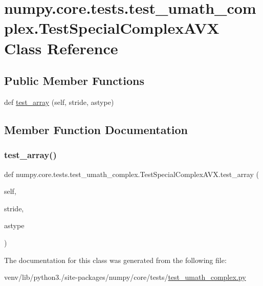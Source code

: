 \hypertarget{classnumpy_1_1core_1_1tests_1_1test__umath__complex_1_1TestSpecialComplexAVX}{}\section{numpy.\+core.\+tests.\+test\+\_\+umath\+\_\+complex.\+Test\+Special\+Complex\+A\+VX Class Reference}
\label{classnumpy_1_1core_1_1tests_1_1test__umath__complex_1_1TestSpecialComplexAVX}
\subsection*{Public Member Functions}
\begin{DoxyCompactItemize}
\item 
def \hyperlink{classnumpy_1_1core_1_1tests_1_1test__umath__complex_1_1TestSpecialComplexAVX_a6d97853c4dc4a00a96a230223026dcdf}{test\+\_\+array} (self, stride, astype)
\end{DoxyCompactItemize}


\subsection{Member Function Documentation}
\mbox{\label{classnumpy_1_1core_1_1tests_1_1test__umath__complex_1_1TestSpecialComplexAVX_a6d97853c4dc4a00a96a230223026dcdf}} 
\subsubsection{\texorpdfstring{test\+\_\+array()}{test\_array()}}
{\footnotesize\ttfamily def numpy.\+core.\+tests.\+test\+\_\+umath\+\_\+complex.\+Test\+Special\+Complex\+A\+V\+X.\+test\+\_\+array (\begin{DoxyParamCaption}\item[{}]{self,  }\item[{}]{stride,  }\item[{}]{astype }\end{DoxyParamCaption})}



The documentation for this class was generated from the following file\+:\begin{DoxyCompactItemize}
\item 
venv/lib/python3./site-\/packages/numpy/core/tests/\hyperlink{test__umath__complex_8py}{test\+\_\+umath\+\_\+complex.\+py}\end{DoxyCompactItemize}
